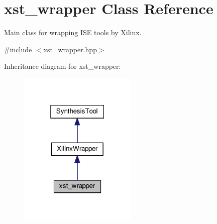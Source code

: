 \hypertarget{classxst__wrapper}{}\section{xst\+\_\+wrapper Class Reference}
\label{classxst__wrapper}


Main class for wrapping I\+SE tools by Xilinx.  




{\ttfamily \#include $<$xst\+\_\+wrapper.\+hpp$>$}



Inheritance diagram for xst\+\_\+wrapper\+:
\nopagebreak
\begin{figure}[H]
\begin{center}
\leavevmode
\includegraphics[width=159pt]{d3/d27/classxst__wrapper__inherit__graph}
\end{center}
\end{figure}


